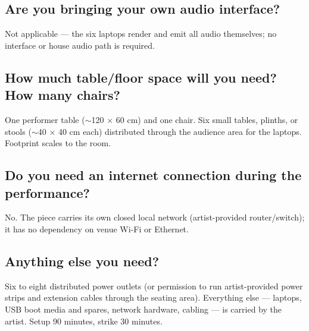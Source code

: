 \documentclass[10pt,letterpaper]{article}
\begin{document}
\subsection{Are you bringing your own audio interface?}
Not applicable --- the six laptops render and emit all audio themselves; no
interface or house audio path is required.

\subsection{How much table/floor space will you need? How many chairs?}
One performer table ($\sim$120 $\times$ 60 cm) and one chair. Six small
tables, plinths, or stools ($\sim$40 $\times$ 40 cm each) distributed
through the audience area for the laptops. Footprint scales to the room.

\subsection{Do you need an internet connection during the performance?}
No. The piece carries its own closed local network (artist-provided
router/switch); it has no dependency on venue Wi-Fi or Ethernet.

\subsection{Anything else you need?}
Six to eight distributed power outlets (or permission to run artist-provided
power strips and extension cables through the seating area). Everything else
--- laptops, USB boot media and spares, network hardware, cabling --- is
carried by the artist. Setup 90 minutes, strike 30 minutes.
\end{document}
